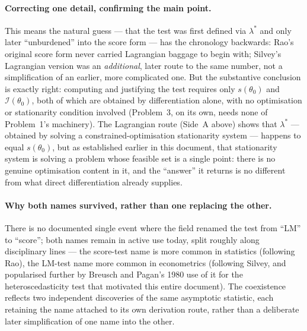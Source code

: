\documentclass[a4paper,oneside,12pt]{extarticle}
\theoremstyle{plain}
\theoremstyle{definition}
\theoremstyle{remark}
\begin{document}
\paragraph{Correcting one detail, confirming the main point.}
This means the natural guess --- that the test was first defined
via $\lambda^*$ and only later ``unburdened'' into the score form
--- has the chronology backwards: Rao's original score form never
carried Lagrangian baggage to begin with; Silvey's Lagrangian
version was an \emph{additional}, later route to the same number,
not a simplification of an earlier, more complicated one. But the
substantive conclusion is exactly right: computing and justifying
the test requires only $s(\theta_0)$ and $\mathcal{I}(\theta_0)$,
both of which are obtained by differentiation alone, with no
optimisation or stationarity condition involved (Problem~3, on its
own, needs none of Problem~1's machinery). The Lagrangian route
(Side~A above) shows that $\lambda^*$ --- obtained by solving a
constrained-optimisation stationarity system --- happens to equal
$s(\theta_0)$, but as established earlier in this document, that
stationarity system is solving a problem whose feasible set is a
single point: there is no genuine optimisation content in it, and
the ``answer'' it returns is no different from what direct
differentiation already supplies.

\paragraph{Why both names survived, rather than one replacing the
other.}
There is no documented single event where the field renamed the
test from ``LM'' to ``score''; both names remain in active use
today, split roughly along disciplinary lines --- the score-test
name is more common in statistics (following Rao), the LM-test name
more common in econometrics (following Silvey, and popularised
further by Breusch and Pagan's 1980 use of it for the
heteroscedasticity test that motivated this entire document). The
coexistence reflects two independent discoveries of the same
asymptotic statistic, each retaining the name attached to its own
derivation route, rather than a deliberate later simplification of
one name into the other.
\end{document}
